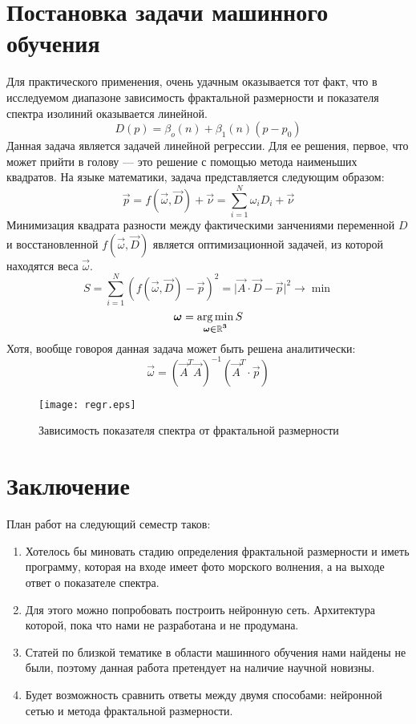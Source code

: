 \documentclass[12pt,twoside]{article}
\begin{document}
\section{Постановка задачи машинного обучения}
Для практического применения, очень удачным оказывается тот факт, что в исследуемом диапазоне зависимость фрактальной размерности и показателя спектра изолиний оказывается линейной. 
$$
D\left( p\right) = \beta_o \left(n\right) + \beta_1 \left(n\right)\left(p - p_0\right)
$$
Данная задача является задачей линейной регрессии. Для ее решения, первое, что может прийти в голову --- это решение с помощью метода наименьших квадратов. На языке математики, задача представляется следующим образом:
$$
\vec{p} = f\left(\vec{\omega}, \vec{D}\right) + \vec{\nu} = \sum\limits_{i = 1}^N \omega_i D_i + \vec{\nu}
$$
Минимизация квадрата разности между фактическими занчениями переменной $D$ и восстановленной $f\left(\vec{\omega}, \vec{D}\right)$  является оптимизационной задачей, из которой находятся веса $\vec{\omega}$.
$$
S = \sum\limits_{i = 1}^N \left(f\left(\vec{\omega}, \vec{D}\right) - \vec{p}\right)^2 = \vert \vec{A}\cdot\vec{D} - \vec{p}\vert^2 \rightarrow \min
$$
$$
\vec{\omega} = \argmin\limits_{\vec{\omega \in \mathbb{R}^3}} S
$$
Хотя, вообще говороя данная задача может быть решена аналитически:
$$
\vec{\omega} = \left(\vec{A}^T \vec{A}\right)^{-1} \left(\vec{A}^T \cdot \vec{p}\right)
$$
\begin{figure}[H]
    \centering
    \texttt{[image: regr.eps]}
    \caption{Зависимость показателя спектра от фрактальной размерности}
\end{figure}

\section{Заключение}
План работ на следующий семестр таков:
\begin{enumerate}
    \item Хотелось бы миновать стадию определения фрактальной размерности и иметь программу, которая на входе имеет фото морского волнения, а на выходе ответ о показателе спектра.
    \item Для этого можно попробовать построить нейронную сеть. Архитектура которой, пока что нами не разработана и не продумана.
    \item Статей по близкой тематике в области машинного обучения нами найдены не были, поэтому данная работа претендует на наличие научной новизны. 
    \item  Будет возможность сравнить ответы между двумя способами: нейронной сетью и метода фрактальной размерности. 
\end{enumerate}
\end{document}
